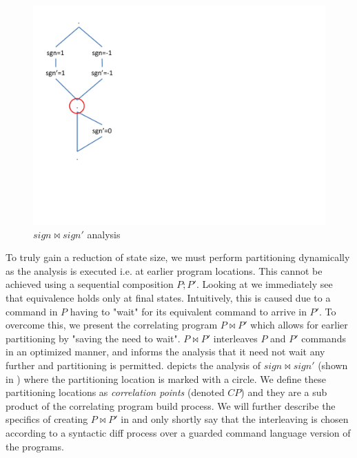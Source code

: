 \begin{figure}
\centering
\includegraphics[scale=0.42,clip=true,trim = 0pt 150pt 450pt 150pt]{figures/sign-graph-correlated}
\caption{$sign \bowtie sign'$ analysis}
\end{figure}

To truly gain a reduction of state size, we must perform partitioning dynamically as the analysis is executed i.e. at earlier program locations. This cannot be achieved using a sequential composition $P;P'$. Looking at  we immediately see that equivalence holds only at final states. Intuitively, this is caused due to a command in $P$ having to "wait" for its equivalent command to arrive in $P'$. To overcome this, we present the correlating program $P \bowtie P'$ which allows for earlier partitioning by "saving the need to wait". $P \bowtie P'$ interleaves $P$ and $P'$ commands in an optimized manner, and informs the analysis that it need not wait any further and partitioning is permitted.  depicts the analysis of $sign \bowtie sign'$ (shown in ) where the partitioning location is marked with a circle. We define these partitioning locations as \emph{correlation points} (denoted $CP$) and they are a sub product of the correlating program build process. We will further describe the specifics of creating $P \bowtie P'$ in  and only shortly say that the interleaving is chosen according to a syntactic diff process over a guarded command language version of the programs.



